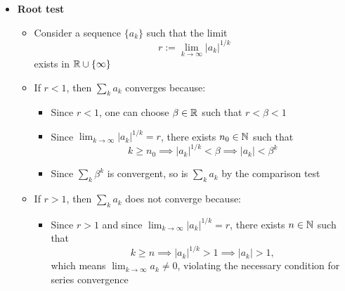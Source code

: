 \documentclass[12pt,a4paper]{article}
\begin{document}
\begin{itemize}
\item \textbf{Root test}
  \begin{itemize}
  \item Consider a sequence $\{a_{k}\}$ such that the limit
    \begin{equation}\nonumber%
      r:=\lim_{k\to\infty} \left|a_{k}\right|^{1/k}
    \end{equation}
    exists in $\mathbb{R}\cup\{\infty\}$
  \item If $r<1$, then $\sum_{k}a_{k}$ converges because:
    \begin{itemize}
    \item Since $r<1$, one can choose $\beta\in \mathbb{R}$ such that $r < \beta < 1$
    \item Since $\lim_{k\to\infty}\left|a_{k}\right|^{1/k}=r$, there exists $n_{0}\in \mathbb{N}$ such that
      \begin{equation}\nonumber%
        k\geq n_{0} \implies |a_{k}|^{1/k}< \beta \implies |a_{k}| < \beta^{k}
      \end{equation}
    \item Since $\sum_{k}\beta^{k}$ is convergent,
      so is $\sum_{k}a_{k}$ by the comparison test
    \end{itemize}
  \item If $r>1$, then $\sum_{k}a_{k}$ does not converge because:
    \begin{itemize}
    \item Since $r>1$ and since $\lim_{k\to\infty}\left|a_{k}\right|^{1/k}=r$,
      there exists $n\in \mathbb{N}$ such that
      \begin{equation}\nonumber%
        k\geq n \implies |a_{k}|^{1/k} > 1 \implies |a_{k}| > 1,
      \end{equation}
      which means $\lim_{k\to\infty}a_{k}\neq 0$, violating the necessary condition for series convergence
    \end{itemize}
  \end{itemize}


\end{itemize}
\end{document}
